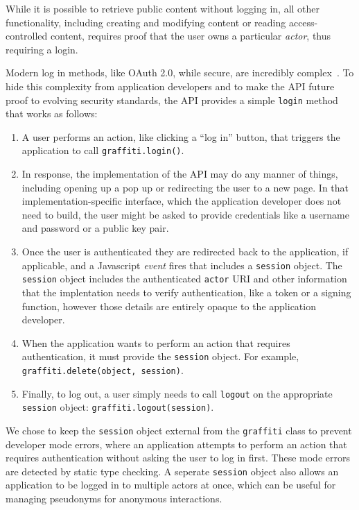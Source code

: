 While it is possible to retrieve public content without logging in,
all other functionality, including
creating and modifying content or reading access-controlled content,
requires proof that the user owns a particular \emph{actor}, thus requiring a login.

Modern log in methods, like OAuth 2.0, while secure, are incredibly complex~\cite{oauth}.
To hide this complexity from application developers and to make the API future proof
to evolving security standards, the API provides a simple \texttt{login} method that works as follows:

\begin{enumerate}
\item
A user performs an action, like clicking a ``log in'' button, that triggers
the application to call \texttt{graffiti.login()}.
\item
In response, the implementation of the API may do any manner of things,
including opening up a pop up or redirecting the user to a new page.
In that implementation-specific interface, which the application developer
does not need to build, the user might be asked to provide credentials like a username
and password or a public key pair.
\item
Once the user is authenticated they are redirected back to the application, if applicable,
and a Javascript \emph{event} fires that includes
a \texttt{session} object. The \texttt{session} object includes the authenticated \texttt{actor}
URI and other information that the implentation needs to verify authentication, like
a token or a signing function, however those details are entirely opaque to the application developer.
\item
When the application wants to perform an action that requires authentication,
it must provide the \texttt{session} object. For example,
\texttt{graffiti.delete(object, session)}.
\item
Finally, to log out, a user simply needs to call \texttt{logout} on the appropriate
\texttt{session} object: \texttt{graffiti.logout(session)}.
\end{enumerate}

We chose to keep the \texttt{session} object external from the \texttt{graffiti} class
to prevent developer mode errors, where an application attempts to perform an action
that requires authentication without asking the user to log in first.
These mode errors are detected by static type checking.
A seperate \texttt{session} object also allows an application to be logged in to
multiple actors at once, which can be useful for managing pseudonyms for anonymous interactions.

